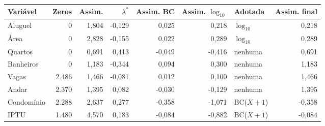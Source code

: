 \begin{tabular}{lrrrrrlr}
\toprule
Variável & Zeros & Assim. & $\lambda^*$ & Assim. BC & Assim. $\log_{10}$ & Adotada & Assim. final \\
\midrule
Aluguel & 0 & 1,804 & -0,129 & 0,025 & 0,218 & $\log_{10}$ & 0,218 \\
Área & 0 & 2,828 & -0,155 & 0,022 & 0,289 & $\log_{10}$ & 0,289 \\
Quartos & 0 & 0,691 & 0,413 & -0,049 & -0,416 & nenhuma & 0,691 \\
Banheiros & 0 & 1,183 & -0,344 & 0,094 & 0,300 & nenhuma & 1,183 \\
Vagas & 2.486 & 1,466 & -0,081 & 0,012 & 0,100 & nenhuma & 1,466 \\
Andar & 2.370 & 1,395 & 0,082 & -0,030 & -0,129 & nenhuma & 1,395 \\
Condomínio & 2.288 & 2,637 & 0,277 & -0,358 & -1,071 & BC($X+1$) & -0,358 \\
IPTU & 1.480 & 4,570 & 0,183 & -0,084 & -0,882 & BC($X+1$) & -0,084 \\
\bottomrule
\end{tabular}
